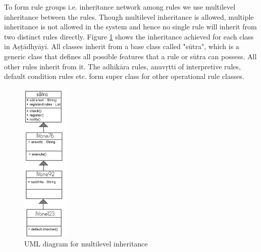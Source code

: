 \documentclass[a4paper,11pt,twoside,openright]{report}
\begin{document}
To form rule groups i.e. inheritance network among rules we use multilevel inheritance between the rules. Though multilevel inheritance is allowed, multiple inheritance is not allowed in the system and hence no single rule will inherit from two distinct rules directly. Figure \ref{fig:UMLinher}
shows the inheritance achieved for each class in Aṣṭādhyāyī. All classes inherit from a base class
called "sūtra", which is a generic class that defines all possible features that a rule or sūtra can possess. All other rules inherit from it. The adhikāra rules, anuvṛtti of interpretive rules, default condition rules etc. form super class for other operational rule classes. 

\begin{figure}[h]
    \centering
	\includegraphics[width=0.2\textwidth]{UMLinher}
    \caption{UML diagram for multilevel inheritance}
    \label{fig:UMLinher}
\end{figure}


\\
\end{document}
